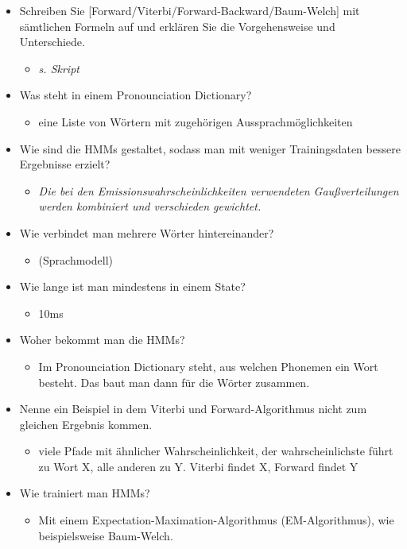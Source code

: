 \begin{itemize}
\begin{itemize}
\end{itemize}
\item Schreiben Sie [Forward/Viterbi/Forward-Backward/Baum-Welch] mit sämtlichen Formeln auf und erklären Sie die Vorgehensweise und Unterschiede.
\begin{itemize}
\item \emph{s. Skript}
\end{itemize}
\item Was steht in einem Pronounciation Dictionary?
\begin{itemize}
\item eine Liste von Wörtern mit zugehörigen Aussprachmöglichkeiten
\end{itemize}
\item Wie sind die HMMs gestaltet, sodass man mit weniger Trainingsdaten bessere Ergebnisse erzielt?
\begin{itemize}
\item \emph{Die bei den Emissionswahrscheinlichkeiten verwendeten Gaußverteilungen werden kombiniert und verschieden gewichtet.}
\end{itemize}
\item Wie verbindet man mehrere Wörter hintereinander?
\begin{itemize}
\item (Sprachmodell)
\end{itemize}
\item Wie lange ist man mindestens in einem State? 
\begin{itemize}
\item 10ms
\end{itemize}
\item Woher bekommt man die HMMs? 
\begin{itemize}
\item Im Pronounciation Dictionary steht, aus welchen Phonemen ein Wort besteht. Das baut man dann für die Wörter zusammen.
\end{itemize}
\item Nenne ein Beispiel in dem Viterbi und Forward-Algorithmus nicht zum gleichen Ergebnis kommen. 
\begin{itemize}
\item viele Pfade mit ähnlicher Wahrscheinlichkeit, der wahrscheinlichste führt zu Wort X, alle anderen zu Y. Viterbi findet X, Forward findet Y
\end{itemize}
\item Wie trainiert man HMMs? 
\begin{itemize}
\item Mit einem Expectation-Maximation-Algorithmus (EM-Algorithmus), wie beispielsweise Baum-Welch.

\end{itemize}
\end{itemize}
